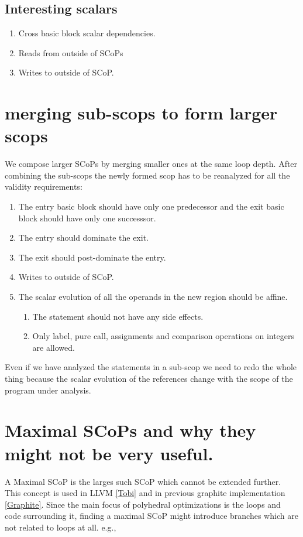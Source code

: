 \subsection{Interesting scalars}
\begin{enumerate}
        \item Cross basic block scalar dependencies.
        \item Reads from outside of SCoPs
        \item Writes to outside of SCoP.
\end{enumerate}


\section{merging sub-scops to form larger scops}
We compose larger SCoPs by merging smaller ones at the same loop depth. After combining the sub-scops
the newly formed scop has to be reanalyzed for all the validity requirements:
\begin{enumerate}
  \item The entry basic block should have only one predecessor and the exit basic block should have only one
    successsor.
  \item The entry should dominate the exit.
  \item The exit should post-dominate the entry.
  \item Writes to outside of SCoP.
  \item The scalar evolution of all the operands in the new region should be affine.

    \begin{enumerate}
      \item The statement should not have any side effects.
      \item Only label, pure call, assignments and comparison operations on integers are allowed.
    \end{enumerate}
\end{enumerate}

Even if we have analyzed the statements in a sub-scop we need to redo the whole thing because the scalar evolution
of the references change with the scope of the program under analysis.

\section{Maximal SCoPs and why they might not be very useful.}
A Maximal SCoP is the larges such SCoP which cannot be extended further. This concept is used
in LLVM \ref{Tobi} and in previous graphite implementation \ref{Graphite}. Since the main focus of
polyhedral optimizations is the loops and code surrounding it, finding a maximal SCoP might introduce branches
which are not related to loops at all. e.g.,

